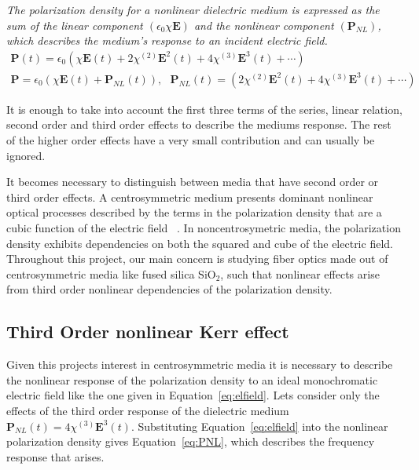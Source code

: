 \begin{tcolorbox}[title=Nonlinear Polarization Density Frequency Response]
\emph{The polarization density for a nonlinear dielectric medium is expressed as the sum of the linear component $(\epsilon_0\chi\textbf{E})$ and the nonlinear component $(\textbf{P}_{NL})$, which describes the medium's response to an incident electric field. }
\begin{subequations}
\begin{gather}
\textbf{P}(t)=\epsilon_0\left(\chi\textbf{E}(t)+2\chi^{(2)}\textbf{E}^2(t)+4\chi^{(3)}\textbf{E}^3(t)+\dotsm\right)\label{eq:TayPden}\\
\textbf{P}=\epsilon_0\left(\chi\textbf{E}(t)+\textbf{P}_{NL}(t)\right) , \ \ \ \textbf{P}_{NL}(t)=\left(2\chi^{(2)}\textbf{E}^2(t)+4\chi^{(3)}\textbf{E}^3(t)+\dotsm\right)
\end{gather}
\end{subequations}
\end{tcolorbox}
It is enough to take into account the first three terms  of the series, linear relation, second order and third order effects to describe the mediums response. The rest of the higher order effects have a very small contribution and can usually be ignored. 

It becomes necessary to distinguish between media that have second order or third order effects. A centrosymmetric medium presents dominant nonlinear optical processes described by the terms in the polarization density that are a cubic function of the electric field ~\cite{levenson1974dispersion}. In noncentrosymetric media, the polarization density exhibits dependencies on both the  squared and cube of the electric field. Throughout this project, our main concern is studying fiber optics made out of centrosymmetric media like fused silica SiO$_2$, such that nonlinear effects arise from third order nonlinear dependencies of the polarization density.

\subsection{Third Order nonlinear Kerr effect}
Given this projects interest in centrosymmetric media it is necessary to describe the nonlinear response of the polarization density to an ideal monochromatic electric field like the one given in Equation~\ref{eq:elfield}.  Lets consider only the effects of the third order response of the dielectric medium $\textbf{P}_{NL}(t)=4\chi^{(3)}\textbf{E}^3(t)$. Substituting Equation~\ref{eq:elfield}  into the nonlinear polarization density  gives Equation~\ref{eq:PNL}, which describes the frequency response that arises.

